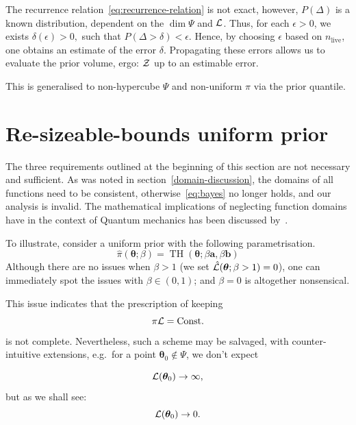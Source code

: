 \documentclass[usenatbib]{mnras}
\DeclareMathOperator{\TopHat}{TH}
\begin{document}
The recurrence relation~\eqref{eq:recurrence-relation} is not exact,
however, \(P(\Delta)\) is a known distribution, dependent on the
\(\dim \Psi\) and \({\cal L}\). Thus, for each \(\epsilon>0\), we
exists
\(\delta(\epsilon) >0,\) such that \(P(\Delta > \delta)<\epsilon.\)
Hence, by choosing \(\epsilon\) based on \(n_\text{live}\), one
obtains an estimate of the error \(\delta\). Propagating these errors
allows us to evaluate the prior volume, ergo: ${\cal Z}$ up to an
estimable error.

This is generalised to non-hypercube $\Psi$ and non-uniform $\pi$ via
the prior quantile.

\section{Re-sizeable-bounds uniform prior}\label{sec:resizeable}

The three requirements outlined at the beginning of this section are
not necessary and sufficient. As was noted in
section~\vref{domain-discussion}, the domains of all functions need to
be consistent, otherwise~\vref{eq:bayes} no longer holds, and our
analysis is invalid. The mathematical implications of neglecting
function domains have in the context of Quantum mechanics has been
discussed by~\cite{Gieres_2000}.

To illustrate, consider a uniform prior with the following
parametrisation.
\begin{equation}
  \hat{\pi}(\bm{\theta}; \beta) = \TopHat(\bm{\theta}; \beta \bm{a}, \beta \bm{b})
\end{equation}
Although there are no issues when \(\beta>1\) (we set
\({\cal\hat{L}}(\bm{\theta}; \beta>1)=0\)), one can immediately
spot the issues with \(\beta \in (0,1)\); and \(\beta=0\) is
altogether nonsensical.

This issue indicates that the prescription of keeping
\begin{equation}
  \pi {\cal L} = \text{Const.}
\end{equation}
is not complete. Nevertheless, such a
scheme may be salvaged, with counter-intuitive extensions, e.g.~for a
point \(\bm{\theta}_{0} \notin \Psi\), we don't expect

\begin{equation}
{\cal L}(\bm{\theta}_{0}) \rightarrow \infty,
\end{equation}
but as we shall see:
  \begin{equation}
    {\cal L}(\bm{\theta}_{0}) \rightarrow 0.
  \end{equation}
\end{document}
